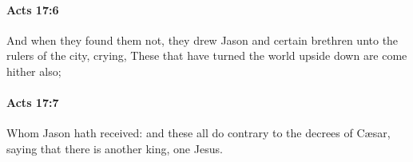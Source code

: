 		\paragraph{Acts 17:6} %
			\label{ACTS-17-6}

			And when they found them not, they drew Jason and certain brethren unto the rulers of the city, crying, These that have turned the world upside down are come hither also;

			\begin{framed}
			\scriptsize
				\begin{compactdesc}
					\item[SBLG] 
				\end{compactdesc}
			\end{framed}

		\paragraph{Acts 17:7} %
			\label{ACTS-17-7}

			Whom Jason hath received: and these all do contrary to the decrees of Cæsar, saying that there is another king, one Jesus.

